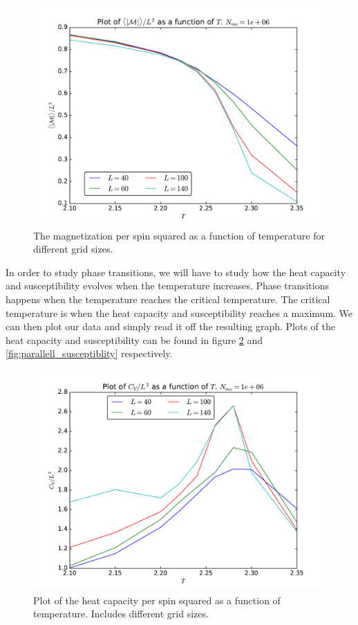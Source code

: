 \documentclass[12pt]{article}
\begin{document}
\begin{figure}[H]
\centering
\includegraphics[width=\linewidth]{Plots/Magnetization_parallellization.pdf}
\caption{The magnetization per spin squared as a function of temperature for different grid sizes.}
\label{fig:parallell_magnetization}
\end{figure}

In order to study phase transitions, we will have to study how the heat capacity and susceptibility evolves when the temperature increases. Phase transitions happens when the temperature reaches the critical temperature. The critical temperature is when the heat capacity and susceptibility reaches a maximum. We can then plot our data and simply read it off the resulting graph. Plots of the heat capacity and susceptibility can be found in figure \ref{fig:parallell_heat_capacity} and \ref{fig:parallell_susceptiblity} respectively.

\begin{figure}[H]
\centering
\includegraphics[width=\linewidth]{Plots/Heat_capacity_parallellization.pdf}
\caption{Plot of the heat capacity per spin squared as a function of temperature. Includes different grid sizes.}
\label{fig:parallell_heat_capacity}
\end{figure}
\end{document}
